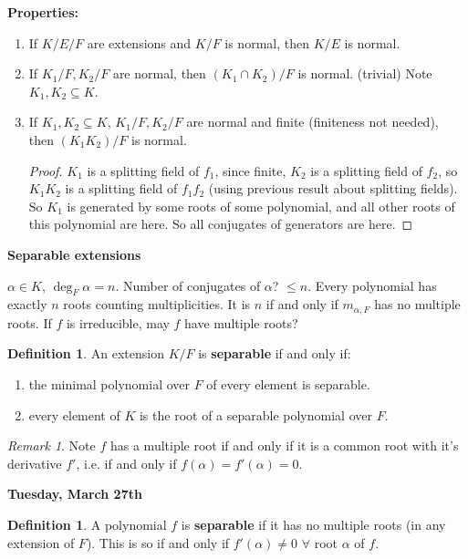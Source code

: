 \documentclass[9pt,reqno,twoside]{amsbook}
\theoremstyle{plain}
\numberwithin{section}{chapter}
\numberwithin{equation}{chapter}
\theoremstyle{definition}
\newtheorem{Def}[theorem]{Definition}
\theoremstyle{remark}
\newtheorem{rem}[theorem]{Remark}
\theoremstyle{plain}
\newcommand{\sub}{\subseteq}
\newcommand{\bb}{\vspace{3mm}}
\renewcommand{\leq}{\leqslant}
\begin{document}
\textbf{Properties: }
\begin{enumerate}
\item If $K/E/F$ are extensions and $K/F$ is normal, then $K/E$ is normal. 
\item If $K_1/F,K_2/F$ are normal, then $(K_1 \cap K_2)/F$ is normal. (trivial) Note $K_1,K_2 \sub K$. 
\item If $K_1,K_2 \sub K$, $K_1/F,K_2/F$ are normal and finite (finiteness not needed), then $(K_1K_2)/F$ is normal. 

\begin{proof}
$K_1$ is a splitting field of $f_1$, since finite, $K_2$ is a splitting field of $f_2$, so $K_1K_2$ is a splitting field of $f_1f_2$ (using previous result about splitting fields).  So $K_1$ is generated by some roots of some polynomial, and all other roots of this polynomial are here. So all conjugates of generators are here. 
\end{proof}
\end{enumerate}

\textbf{Separable extensions}

$\alpha \in K$, $\deg_F \alpha = n$. Number of conjugates of $\alpha$? $\leq n$. Every polynomial has exactly $n$ roots counting multiplicities. It is $n$ if and only if $m_{\alpha,F}$ has no multiple roots. If $f$ is irreducible, may $f$ have multiple roots? 

 \begin{Def}
An extension $K/F$ is \textbf{separable} if and only if:
\begin{enumerate}
\item the minimal polynomial over $F$ of every element is separable. 
\item every element of $K$ is the root of a separable polynomial over $F$.
\end{enumerate} 
\end{Def}

\begin{rem}
Note $f$ has a multiple root if and only if it is a common root with it's derivative $f'$, i.e. if and only if $f(\alpha) = f'(\alpha) = 0$. 
\end{rem}


\bb

\textbf{Tuesday, March 27th}


\begin{Def}
A polynomial $f$ is \textbf{separable} if it has no multiple roots (in any extension of $F$). This is so if and only if $f'(\alpha) \neq 0$ $\forall$ root $\alpha$ of $f$. 
\end{Def}
\end{document}
